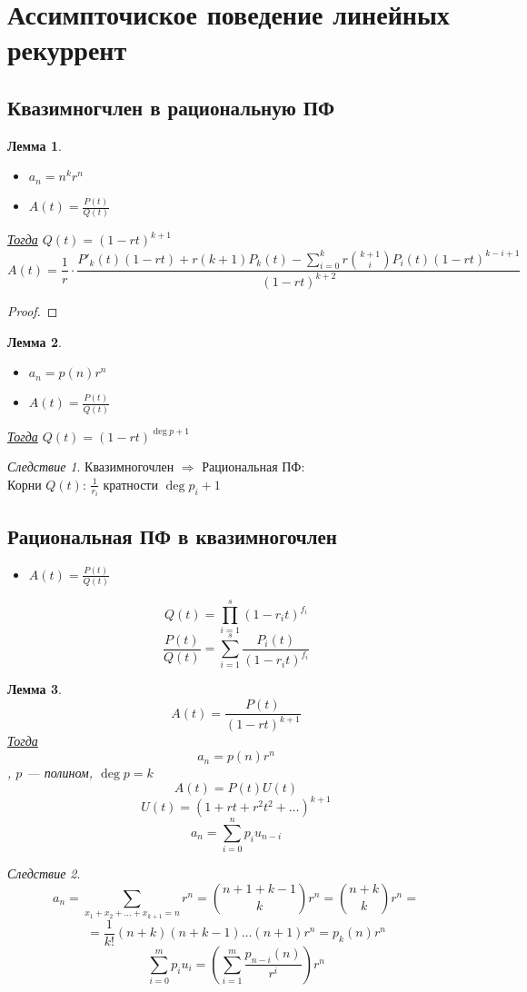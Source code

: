 \documentclass[oneside]{book}
\newcommand{\todo}{{\color{red}\fbox{\text{Доделать}}}}
\theoremstyle{plain}
\newtheorem{lemma}{Лемма}
\theoremstyle{remark}
\newtheorem{corollary}{Следствие}[theorem]
\theoremstyle{definition}
\begin{document}
\section{Ассимпточиское поведение линейных рекуррент}
\label{sec:org2afd8c9}
\subsection{Квазимногчлен в рациональную ПФ}
\label{sec:org522201c}
\begin{lemma}
\-
\begin{itemize}
\item \(a_n = n^k r^n\)
\item \(A(t) = \frac{P(t)}{Q(t)}\)
\end{itemize}
\uline{Тогда} \(Q(t) = (1 - rt)^{k + 1}\)
\[ A(t) = \frac{1}{r}\cdot \frac{P'_k(t)(1 - rt) + r(k + 1)P_k(t) - \sum_{i = 0}^k r \binom{k + 1}{i} P_i(t) (1 - rt)^{k - i + 1}}{(1 - rt)^{k + 2}} \]
\end{lemma}
\begin{proof}
\todo
\end{proof}
\begin{lemma}
\-
\begin{itemize}
\item \(a_n = p(n) r^n\)
\item \(A(t) = \frac{P(t)}{Q(t)}\)
\end{itemize}
\uline{Тогда} \(Q(t) = (1 - rt)^{\deg p + 1}\)
\end{lemma}
\begin{corollary}
Квазимногочлен \(\Rightarrow\) Рациональная ПФ: \\
Корни \(Q(t)\): \(\frac{1}{r_i}\) кратности \(\deg p_i + 1\)
\end{corollary}

\subsection{Рациональная ПФ в квазимногочлен}
\label{sec:org5d85c44}
\begin{itemize}
\item \(A(t) = \frac{P(t)}{Q(t)}\)
\end{itemize}
\[ Q(t) = \prod_{i = 1}^s (1 - r_it)^{f_i} \]
\[ \frac{P(t)}{Q(t)} = \sum_{i = 1}^s \frac{P_i(t)}{(1 - r_i t)^{f_i}} \]
\begin{lemma}
\[ A(t) = \frac{P(t)}{(1 - rt)^{k + 1}} \]
\uline{Тогда} \[ a_n = p(n) r^n \], \(p\) --- полином, \(\deg p = k\)
\[ A(t) = P(t) U(t) \]
\[ U(t) = (1 + rt + r^2 t^2 + \dots)^{k + 1} \]
\[ a_n = \sum_{i = 0}^n p_i u_{n - i} \]
\end{lemma}
\begin{corollary}
\[ a_n = \sum_{x_1 + x_2 + \dots + x_{k + 1} = n} r^n = \binom{n + 1 + k - 1}{k}r^n = \binom{n + k}{k}r^n = \]
\[ = \frac{1}{k!}(n + k)(n + k - 1)\dots(n + 1)r^n = p_k(n)r^n \]
\[ \sum_{i = 0}^m p_i u_i = \left(\sum_{i = 1}^m \frac{p_{n - i}(n)}{r^i}\right)r^n \]
\end{corollary}
\end{document}
